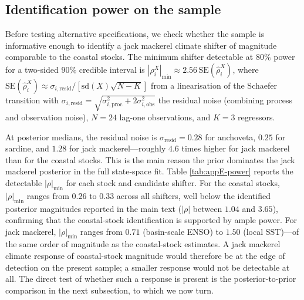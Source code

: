 \documentclass[
  11pt,
]{article}
\begin{document}
\subsection{Identification power on the sample}\label{sec:appendix-spatial-power}

Before testing alternative specifications, we check whether the sample
is informative enough to identify a jack mackerel climate shifter of magnitude
comparable to the coastal stocks. The minimum shifter detectable at
\(80\%\) power for a two-sided \(90\%\) credible interval is
\(|\rho_i^X|_{\min}\approx 2.56\,\mathrm{SE}(\hat{\rho}_i^X)\), where
\(\mathrm{SE}(\hat{\rho}_i^X)\approx\sigma_{i,\text{resid}}/[\mathrm{sd}(X)\sqrt{N-K}]\)
from a linearisation of the Schaefer transition with
\(\sigma_{i,\text{resid}}=\sqrt{\sigma_{i,\text{proc}}^2+2\sigma_{i,\text{obs}}^2}\)
the residual noise (combining process and observation noise), \(N=24\)
lag-one observations, and \(K=3\) regressors.

At posterior medians, the residual noise is \(\sigma_{\text{resid}}=0.28\)
for anchoveta, \(0.25\) for sardine, and \(1.28\) for jack mackerel---roughly \(4.6\)
times higher for jack mackerel than for the coastal stocks. This is the main
reason the prior dominates the jack mackerel posterior in the full state-space
fit. Table \ref{tab:appE-power} reports the detectable \(|\rho|_{\min}\)
for each stock and candidate shifter. For the coastal stocks,
\(|\rho|_{\min}\) ranges from \(0.26\) to \(0.33\) across all shifters, well
below the identified posterior magnitudes reported in the main text
(\(|\rho|\) between \(1.04\) and \(3.65\)), confirming that the coastal-stock
identification is supported by ample power. For jack mackerel, \(|\rho|_{\min}\)
ranges from \(0.71\) (basin-scale ENSO) to \(1.50\) (local SST)---of the
same order of magnitude as the coastal-stock estimates. A jack mackerel climate
response of coastal-stock magnitude would therefore be at the edge of
detection on the present sample; a smaller response would not be
detectable at all. The direct test of whether such a response is
present is the posterior-to-prior comparison in the next subsection,
to which we now turn.
\end{document}
